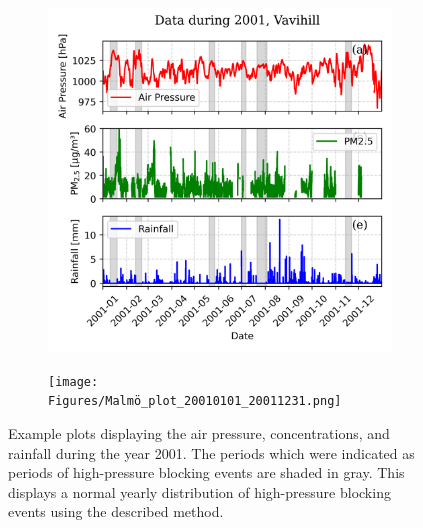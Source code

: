 \begin{figure}[H]
    \centering
    \begin{subfigure}[b]{0.49\textwidth}
        \centering
        \includegraphics[width=\textwidth]{Figures/Vavihill_plot_20010101_20011231.png}
        \label{fig:2001Vavihill}
    \end{subfigure}
    \hfill
    \begin{subfigure}[b]{0.49\textwidth}
        \centering
        \texttt{[image: Figures/Malmö\_plot\_20010101\_20011231.png]}
        \label{fig:2001Malmö}
    \end{subfigure}
    \caption{Example plots displaying the air pressure, \PM concentrations, and rainfall during the year 2001. The periods which were indicated as periods of high-pressure blocking events are shaded in gray. This displays a normal yearly distribution of high-pressure blocking events using the described method.}
    \label{fig:2001}
\end{figure}

